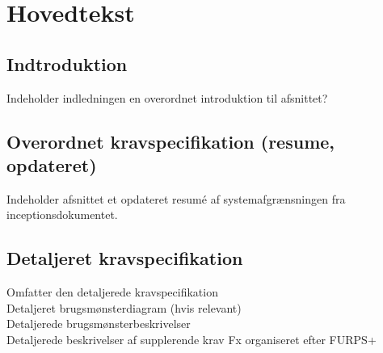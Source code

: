 \chapter{Hovedtekst}

\section{Indtroduktion}
Indeholder indledningen en overordnet introduktion til afsnittet?\\

\section{Overordnet kravspecifikation (resume, opdateret)}
Indeholder afsnittet et opdateret resumé  af systemafgrænsningen fra inceptionsdokumentet.

\section{Detaljeret kravspecifikation}
Omfatter den detaljerede kravspecifikation\\
Detaljeret brugsmønsterdiagram (hvis relevant)\\
Detaljerede brugsmønsterbeskrivelser\\
Detaljerede beskrivelser af supplerende krav Fx organiseret efter FURPS+\\



